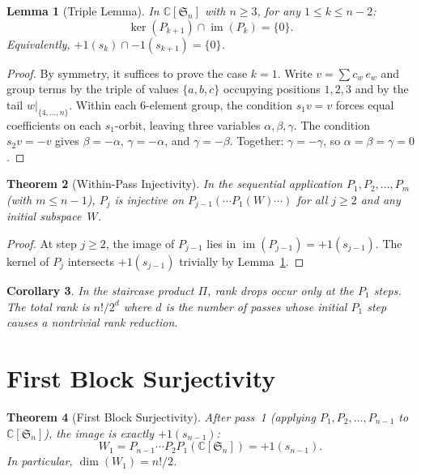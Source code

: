 \documentclass[11pt]{article}
\newtheorem{theorem}{Theorem}
\newtheorem{lemma}[theorem]{Lemma}
\newtheorem{corollary}[theorem]{Corollary}
\theoremstyle{definition}
\theoremstyle{remark}
\newcommand{\CC}{\mathbb{C}}
\newcommand{\Sym}{\mathfrak{S}}
\newcommand{\im}{\operatorname{im}}
\begin{document}
\begin{lemma}[Triple Lemma]
\label{lem:triple}
In $\CC[\Sym_n]$ with $n \ge 3$, for any $1 \le k \le n-2$:
\[
  \ker(P_{k+1}) \cap \im(P_k) = \{0\}.
\]
Equivalently, $+1(s_k) \cap -1(s_{k+1}) = \{0\}$.
\end{lemma}

\begin{proof}
By symmetry, it suffices to prove the case $k = 1$. Write
$v = \sum c_w \, e_w$ and group terms by the triple of values
$\{a, b, c\}$ occupying positions $1, 2, 3$ and by the tail
$w|_{\{4,\dots,n\}}$. Within each 6-element group, the condition
$s_1 v = v$ forces equal coefficients on each $s_1$-orbit, leaving
three variables $\alpha, \beta, \gamma$. The condition $s_2 v = -v$
gives $\beta = -\alpha$, $\gamma = -\alpha$, and $\gamma = -\beta$.
Together: $\gamma = -\gamma$, so $\alpha = \beta = \gamma = 0$.
\end{proof}

\begin{theorem}[Within-Pass Injectivity]
\label{thm:injectivity}
In the sequential application $P_1, P_2, \dots, P_m$ (with $m \le n-1$),
$P_j$ is injective on $P_{j-1}(\cdots P_1(W)\cdots)$ for all $j \ge 2$
and any initial subspace~$W$.
\end{theorem}

\begin{proof}
At step $j \ge 2$, the image of $P_{j-1}$ lies in $\im(P_{j-1}) = +1(s_{j-1})$.
The kernel of $P_j$ intersects $+1(s_{j-1})$ trivially by
Lemma~\ref{lem:triple}.
\end{proof}

\begin{corollary}
\label{cor:rank-structure}
In the staircase product $\Pi$, rank drops occur only at the $P_1$
steps. The total rank is $n!/2^d$ where $d$ is the number of
passes whose initial $P_1$ step causes a nontrivial rank reduction.
\end{corollary}


\section{First Block Surjectivity}

\begin{theorem}[First Block Surjectivity]
\label{thm:first-block}
After pass~1 (applying $P_1, P_2, \dots, P_{n-1}$ to $\CC[\Sym_n]$),
the image is exactly $+1(s_{n-1})$:
\[
  W_1 = P_{n-1} \cdots P_2 P_1(\CC[\Sym_n]) = +1(s_{n-1}).
\]
In particular, $\dim(W_1) = n!/2$.
\end{theorem}
\end{document}
